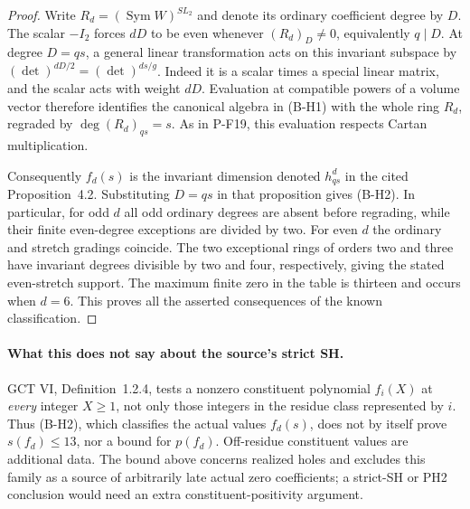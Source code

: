 \documentclass[11pt,a4paper]{article}
\begin{document}
\begin{proof}
Write $R_d=(\operatorname{Sym}W)^{SL_2}$ and denote its ordinary
coefficient degree by $D$. The scalar $-I_2$ forces $dD$ to be
even whenever $(R_d)_D\ne0$, equivalently $q\mid D$.
At degree $D=qs$, a general linear transformation acts on this
invariant subspace by $(\det)^{dD/2}=(\det)^{ds/g}$.
Indeed it is a scalar times a special linear matrix, and the scalar
acts with weight $dD$. Evaluation at compatible powers of a volume
vector therefore identifies the canonical algebra in (B-H1) with
the whole ring $R_d$, regraded by $\deg (R_d)_{qs}=s$.
As in P-F19, this evaluation respects Cartan multiplication.

Consequently $f_d(s)$ is the invariant dimension denoted
$h^d_{qs}$ in the cited Proposition~4.2. Substituting $D=qs$ in
that proposition gives (B-H2). In particular, for odd $d$ all odd
ordinary degrees are absent before regrading, while their finite
even-degree exceptions are divided by two. For even $d$ the
ordinary and stretch gradings coincide. The two exceptional rings
of orders two and three have invariant degrees divisible by two
and four, respectively, giving the stated even-stretch support.
The maximum finite zero in the table is thirteen and occurs when
$d=6$. This proves all the asserted consequences of the known
classification.
\end{proof}

\paragraph{What this does not say about the source's strict SH.}
GCT VI, Definition~1.2.4, tests a nonzero constituent polynomial
$f_i(X)$ at \emph{every} integer $X\ge1$, not only those integers
in the residue class represented by $i$. Thus (B-H2), which
classifies the actual values $f_d(s)$, does not by itself prove
$s(f_d)\le13$, nor a bound for $p(f_d)$. Off-residue constituent
values are additional data. The bound above concerns realized
holes and excludes this family as a source of arbitrarily late
actual zero coefficients; a strict-SH or PH2 conclusion would need
an extra constituent-positivity argument.
\end{document}
